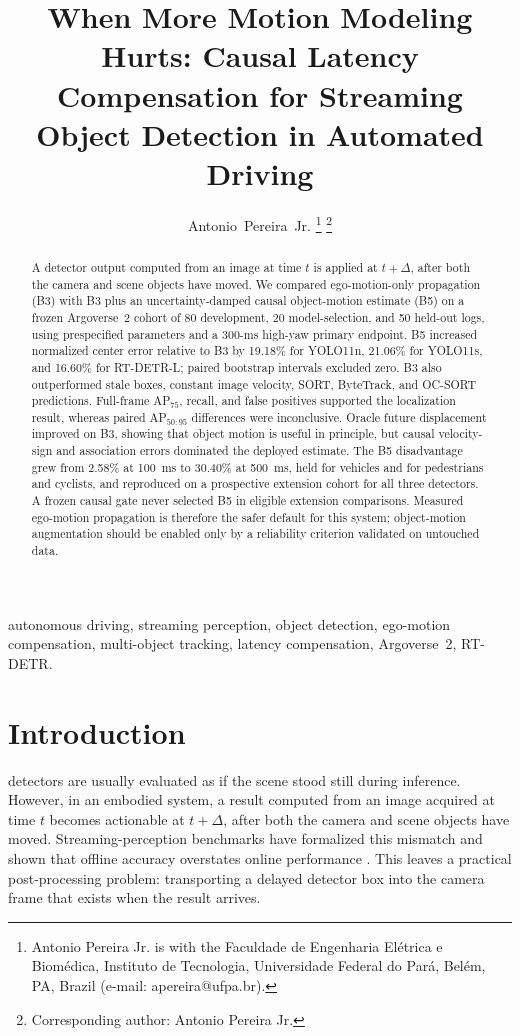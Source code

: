 \documentclass[journal]{IEEEtran}
\title{When More Motion Modeling Hurts: Causal Latency Compensation for Streaming Object Detection in Automated Driving}
\author{Antonio~Pereira~Jr.%
\thanks{Antonio Pereira Jr. is with the Faculdade de Engenharia El\'etrica e Biom\'edica, Instituto de Tecnologia, Universidade Federal do Par\'a, Bel\'em, PA, Brazil (e-mail: apereira@ufpa.br).}%
\thanks{Corresponding author: Antonio Pereira Jr.}}
\begin{document}
\maketitle

\begin{abstract}
A detector output computed from an image at time $t$ is applied at $t+\Delta$, after both the camera and scene objects have moved. We compared ego-motion-only propagation (B3) with B3 plus an uncertainty-damped causal object-motion estimate (B5) on a frozen Argoverse~2 cohort of 80 development, 20 model-selection, and 50 held-out logs, using prespecified parameters and a 300-ms high-yaw primary endpoint. B5 increased normalized center error relative to B3 by 19.18\% for YOLO11n, 21.06\% for YOLO11s, and 16.60\% for RT-DETR-L; paired bootstrap intervals excluded zero. B3 also outperformed stale boxes, constant image velocity, SORT, ByteTrack, and OC-SORT predictions. Full-frame AP$_{75}$, recall, and false positives supported the localization result, whereas paired AP$_{50:95}$ differences were inconclusive. Oracle future displacement improved on B3, showing that object motion is useful in principle, but causal velocity-sign and association errors dominated the deployed estimate. The B5 disadvantage grew from 2.58\% at 100~ms to 30.40\% at 500~ms, held for vehicles and for pedestrians and cyclists, and reproduced on a prospective extension cohort for all three detectors. A frozen causal gate never selected B5 in eligible extension comparisons. Measured ego-motion propagation is therefore the safer default for this system; object-motion augmentation should be enabled only by a reliability criterion validated on untouched data.
\end{abstract}


\begin{IEEEkeywords}
autonomous driving, streaming perception, object detection, ego-motion compensation, multi-object tracking, latency compensation, Argoverse~2, RT-DETR.
\end{IEEEkeywords}

\section{Introduction}
 detectors are usually evaluated as if the scene stood still during inference. However, in an embodied system, a result computed from an image acquired at time $t$ becomes actionable at $t+\Delta$, after both the camera and scene objects have moved. Streaming-perception benchmarks have formalized this mismatch and shown that offline accuracy overstates online performance \cite{Li2020Streaming,Yang2022Streaming,Wang2023ASAP}. This leaves a practical post-processing problem: transporting a delayed detector box into the camera frame that exists when the result arrives.
\end{document}
